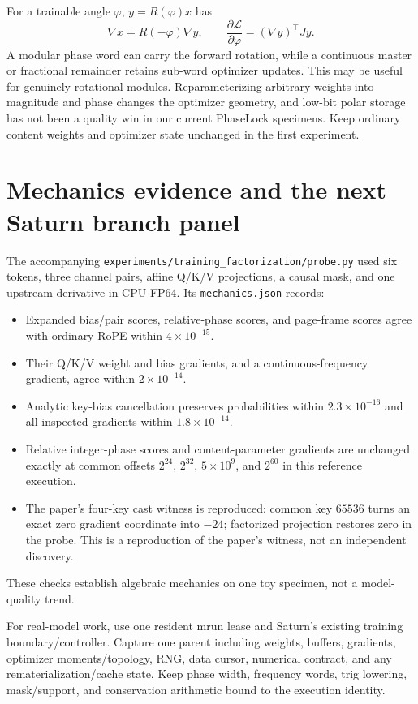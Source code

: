 \documentclass[11pt]{article}
\begin{document}
For a trainable angle $\varphi$, $y=R(\varphi)x$ has
\begin{equation}
 \nabla x=R(-\varphi)\nabla y,\qquad
 \frac{\partial\mathcal L}{\partial\varphi}=(\nabla y)^\top Jy.
\end{equation}
A modular phase word can carry the forward rotation, while a continuous master or fractional remainder retains sub-word optimizer updates. This may be useful for genuinely rotational modules. Reparameterizing arbitrary weights into magnitude and phase changes the optimizer geometry, and low-bit polar storage has not been a quality win in our current PhaseLock specimens. Keep ordinary content weights and optimizer state unchanged in the first experiment.

\section{Mechanics evidence and the next Saturn branch panel}

The accompanying \texttt{experiments/training\_factorization/probe.py} used six tokens, three channel pairs, affine Q/K/V projections, a causal mask, and one upstream derivative in CPU FP64. Its \texttt{mechanics.json} records:
\begin{itemize}
 \item Expanded bias/pair scores, relative-phase scores, and page-frame scores agree with ordinary RoPE within $4\times10^{-15}$.
 \item Their Q/K/V weight and bias gradients, and a continuous-frequency gradient, agree within $2\times10^{-14}$.
 \item Analytic key-bias cancellation preserves probabilities within $2.3\times10^{-16}$ and all inspected gradients within $1.8\times10^{-14}$.
 \item Relative integer-phase scores and content-parameter gradients are unchanged exactly at common offsets $2^{24}$, $2^{32}$, $5\times10^9$, and $2^{60}$ in this reference execution.
 \item The paper's four-key cast witness is reproduced: common key $65536$ turns an exact zero gradient coordinate into $-24$; factorized projection restores zero in the probe. This is a reproduction of the paper's witness, not an independent discovery.
\end{itemize}
These checks establish algebraic mechanics on one toy specimen, not a model-quality trend.

For real-model work, use one resident mrun lease and Saturn's existing training boundary/controller. Capture one parent including weights, buffers, gradients, optimizer moments/topology, RNG, data cursor, numerical contract, and any rematerialization/cache state. Keep phase width, frequency words, trig lowering, mask/support, and conservation arithmetic bound to the execution identity.
\end{document}
